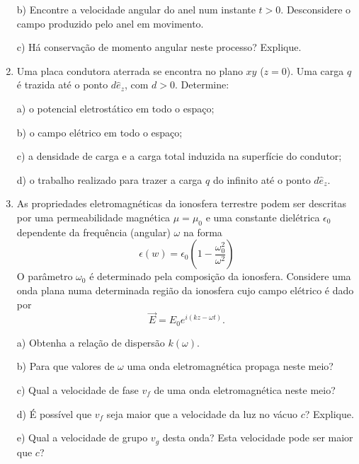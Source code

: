 \begin{enumerate}[start=1,label={\bfseries Q\arabic*.}]
\resposta

b) Encontre a velocidade angular do anel num instante $t > 0$. Desconsidere o campo produzido pelo anel em movimento.

\resposta

c) Há conservação de momento angular neste processo? Explique.

\resposta


\item Uma placa condutora aterrada se encontra no plano $xy$ ($z=0$). Uma carga $q$ é trazida até o ponto $d\hat{e}_{z}$, com $d > 0$. Determine:

a) o potencial eletrostático em todo o espaço;

\resposta

b) o campo elétrico em todo o espaço;

\resposta

c) a densidade de carga e a carga total induzida na superfície do condutor;

\resposta

d) o trabalho realizado para trazer a carga $q$ do infinito até o ponto $d\hat{e}_{z}$.

\resposta



\item As propriedades eletromagnéticas da ionosfera terrestre podem ser descritas por uma permeabilidade magnética $\mu = \mu_{0}$ e uma constante dielétrica $\epsilon_{0}$ dependente da frequência (angular) $\omega$ na forma
$$
\epsilon(w) = \epsilon_{0} \left(  1 - \frac{\omega_{0}^{2}}{\omega^{2}}   \right)
$$
O parâmetro $\omega_{0}$ é determinado pela composição da ionosfera. Considere uma onda plana numa determinada região da ionosfera cujo campo elétrico é dado por
$$
\vec{E} = E_{0} e^{i(kz - \omega t)}.
$$

a) Obtenha a relação de dispersão $k(\omega)$.

\resposta

b) Para que valores de $\omega$ uma onda eletromagnética propaga neste meio?

\resposta

c) Qual a velocidade de fase $v_{f}$ de uma onda eletromagnética neste meio?

\resposta

d) É possível que $v_{f}$ seja maior que a velocidade da luz no vácuo $c$? Explique.

\resposta

e) Qual a velocidade de grupo $v_{g}$ desta onda? Esta velocidade pode ser maior que $c$?


\end{enumerate}
